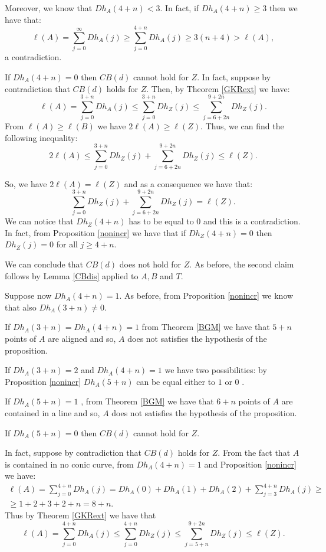 \documentclass[a4paper,10pt,oneside]{article}
\theoremstyle{casep}
\theoremstyle{definition}
\begin{document}
Moreover, we know that $ Dh_A(4+n)<3 $. In fact, if $ Dh_A(4+n) \geq 3 $ then we have that:$$ \ell(A) = \sum_{j=0}^{\infty}Dh_A(j) \geq \sum_{j=0}^{4+n}Dh_A(j) \geq 3(n+4)>\ell(A),$$ a contradiction.

If $ Dh_A(4+n)=0 $ then $CB(d)$ cannot hold for $ Z $. 
In fact, suppose by contradiction that $CB(d)$ holds for $ Z $.
Then, by Theorem \ref{GKRext} we have: 
$$ \ell(A) = \sum_{j=0}^{3+n} Dh_A(j) \leq \sum_{j=0}^{3+n} Dh_Z(j) \leq \sum_{j=6+2n}^{9+2n} Dh_Z(j) .$$
From $ \ell(A) \geq \ell(B) $ we have $ 2\ell(A) \geq \ell(Z) $. Thus, we can find the following inequality:
\begin{equation}
2\ell(A) \leq \sum_{j=0}^{3+n} Dh_Z(j) + \sum_{j=6+2n}^{9+2n} Dh_Z(j) \leq \ell(Z).
\label{3}
\end{equation} 

So, we have $ 2 \ell(A)=\ell(Z) $ and as a consequence we have that: $$\sum_{j=0}^{3+n} Dh_Z(j) + \sum_{j=6+2n}^{9+2n} Dh_Z(j) = \ell(Z).$$
We can notice that $ Dh_Z(4+n) $ has to be equal to $ 0 $ and this is a contradiction. In fact, from Proposition \ref{nonincr} we have that if $ Dh_Z(4+n)=0 $ then $ Dh_Z(j)=0 $ for all $ j \geq 4+n $.

We can conclude that $ CB(d) $ does not hold for $ Z $.
As before, the second claim follows by Lemma \ref{CBdis} applied to $A,B$ and $T$.


Suppose now $ Dh_A(4+n) = 1 $. As before, from Proposition \ref{nonincr} we know that also $ Dh_A(3+n) \neq 0 $.

If $ Dh_A(3+n)=Dh_A(4+n)=1 $ from Theorem \ref{BGM} we have that $ 5+n$ points of $ A $ are aligned and so, $ A $ does not satisfies the hypothesis of the proposition.

If $ Dh_A(3+n)=2 $ and $ Dh_A(4+n)=1 $ we have two possibilities: by Proposition \ref{nonincr} $ Dh_A(5+n) $ can be equal either to $ 1 $ or $ 0 $ . 

If $Dh_A(5+n)=1$ , from Theorem \ref{BGM} we have that $ 6+n $ points of $ A $ are contained in a line and so, $ A $ does not satisfies the hypothesis of the proposition. 

If $Dh_A(5+n)=0$ then $CB(d)$ cannot hold for $ Z $. 

In fact, suppose by contradiction that $ CB(d) $ holds for $ Z $.
From the fact that $ A $ is contained in no conic curve, from $ Dh_A(4+n)=1 $ and Proposition \ref{nonincr} we have:\begin{multline*}
	\ell(A)=\sum_{j=0}^{4+n} Dh_A(j) = Dh_A(0)+Dh_A(1)+ Dh_A(2)+\sum_{j=3}^{4+n} Dh_A(j) \geq \\ \geq 1+2+3+2+n=8+n.
\end{multline*} 
Thus by Theorem \ref{GKRext} we have that $$ \ell(A)= \sum_{j=0}^{4+n}Dh_A(j) \leq \sum_{j=0}^{4+n}Dh_Z(j) \leq \sum_{j=5+n}^{9+2n} Dh_Z(j) \leq \ell(Z) .$$
\end{document}
